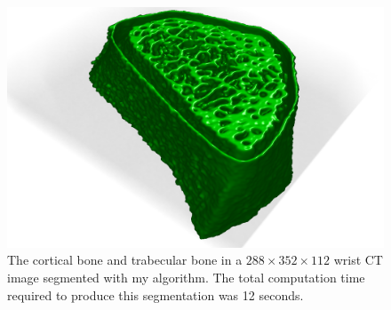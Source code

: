 \begin{figure}[t]
\centering
\includegraphics[width=6.0in]{figures/Bone-3D.png}
\caption{The cortical bone and trabecular bone in a $288 \times 352 \times 112$ wrist CT image segmented with my algorithm. The total computation time required to produce this segmentation was 12 seconds.}
\label{fig:bone}
\end{figure}

